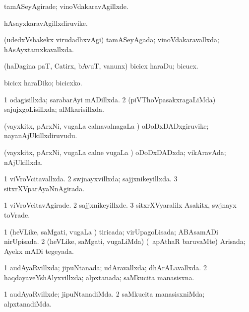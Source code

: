{\bentry
{} 
\gl{\kirxvi}
\expl{}
\bmng
 tamASeyAgirade; vinoVdakaravAgillxde. 
\emng
\eentry

\bentry
{} 
\gl{\nA}
\expl{}
\bmng
 hAsayxkaravAgillxdiruvike. 
\emng
\eentry

\bentry
{} 
\gl{\gu}
\expl{}
\bmng
 (udedxVshakekx virudadhxvAgi) tamASeyAgada; vinoVdakaravallxda; hAsAyxtamxkavallxda. 
\emng
\eentry

\bentry
{} 
\gl{\sakirx}
\expl{}
\bmng
 (haDagina paT, Catirx, bAvuT, \mo vanunx) bicicx haraDu; bicucx. 
\emng

\noindent
 \gl{\akirx} \bmng
bicicx haraDiko; bicicxko. 
\emng
\eentry

\bentry
{} 
\gl{\gu}
\expl{}
\bmng
\bnum
\num{1} odagisillxda; sarabarAyi mADillxda. 
\num{2} (piVThoVpasakxragaLiMda) sajujxgoLisillxda; alMkarisillxda. 
\enum
\emng
\eentry

\bentry
{} 
\gl{\nA}
\expl{}
\bmng
 (vayxkitx, pArxNi, \mo vugaLa calnavalnagaLa \vi) oDoDxDADxgiruvike; nayanAjUkillxdiruvudu. 
\emng
\eentry

\bentry
{} 
\gl{\gu}
\expl{}
\bmng
 (vayxkitx, pArxNi, \mo vugaLa calne \mo vugaLa \vi) oDoDxDADxda; vikAravAda; nAjUkillxda. 
\emng
\eentry

\bentry
{} 
\gl{\gu}
\expl{}
\bmng
\bnum
\num{1} viVroVcitavallxda. 
\num{2} swjnayxvillxda; sajjxnikeyillxda. 
\num{3} sitxrXVparAyaNnAgirada. 
\enum
\emng
\eentry

\bentry
{} 
\gl{\kirxvi}
\expl{}
\bmng
\bnum
\num{1} viVroVcitavAgirade. 
\num{2} sajjxnikeyillxde. 
\num{3} sitxrXVyaralilx Asakitx, swjnayx toVrade. 
\enum
\emng
\eentry

\bentry
{} 
\gl{\gu}
\expl{}
\bmng
\bnum
\num{1} (heVLike, saMgati, \mo vugaLa \vi) tiricada; virUpagoLisada; ABAsamADi nirUpisada. 
\num{2} (heVLike, saMgati, \mo vugaLiMda) (\kanmu\ apAthaR baruvaMte) Arisada; Ayekx mADi tegeyada. 
\enum
\emng
\eentry

\bentry
{} 
\gl{\gu}
\expl{}
\bmng
\bnum
\num{1} audAyaRvillxda; jipuNtanada; udAravallxda; dhArALavallxda. 
\num{2} haqdayaveYshAlyxvillxda; alpxtanada; saMkucita manasisxna. 
\enum
\emng
\eentry

\bentry
{} 
\gl{\kirxvi}
\expl{}
\bmng
\bnum
\num{1} audAyaRvillxde; jipuNtanadiMda. 
\num{2} saMkucita manasisxniMda; alpxtanadiMda. 
\enum
\emng
\eentry

}
